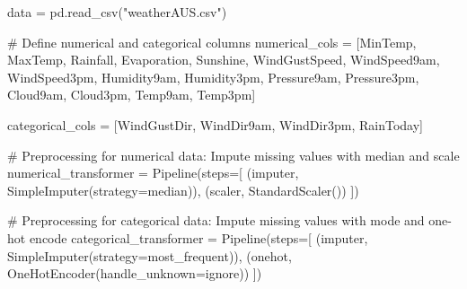 \documentclass[
  letterpaper,
  DIV=11,
  numbers=noendperiod]{scrartcl}
\newenvironment{Shaded}{\begin{snugshade}}{\end{snugshade}}
\newcommand{\CommentTok}[1]{\textcolor[rgb]{0.37,0.37,0.37}{#1}}
\newcommand{\NormalTok}[1]{\textcolor[rgb]{0.00,0.23,0.31}{#1}}
\newcommand{\OperatorTok}[1]{\textcolor[rgb]{0.37,0.37,0.37}{#1}}
\newcommand{\StringTok}[1]{\textcolor[rgb]{0.13,0.47,0.30}{#1}}
\begin{document}
\begin{Shaded}
\begin{Highlighting}[]
\NormalTok{data }\OperatorTok{=}\NormalTok{ pd.read\_csv(}\StringTok{"weatherAUS.csv"}\NormalTok{)}

\CommentTok{\# Define numerical and categorical columns}
\NormalTok{numerical\_cols }\OperatorTok{=}\NormalTok{ [}\StringTok{\textquotesingle{}MinTemp\textquotesingle{}}\NormalTok{, }\StringTok{\textquotesingle{}MaxTemp\textquotesingle{}}\NormalTok{, }\StringTok{\textquotesingle{}Rainfall\textquotesingle{}}\NormalTok{, }\StringTok{\textquotesingle{}Evaporation\textquotesingle{}}\NormalTok{, }\StringTok{\textquotesingle{}Sunshine\textquotesingle{}}\NormalTok{, }\StringTok{\textquotesingle{}WindGustSpeed\textquotesingle{}}\NormalTok{, }\StringTok{\textquotesingle{}WindSpeed9am\textquotesingle{}}\NormalTok{,}
                  \StringTok{\textquotesingle{}WindSpeed3pm\textquotesingle{}}\NormalTok{, }\StringTok{\textquotesingle{}Humidity9am\textquotesingle{}}\NormalTok{, }\StringTok{\textquotesingle{}Humidity3pm\textquotesingle{}}\NormalTok{, }\StringTok{\textquotesingle{}Pressure9am\textquotesingle{}}\NormalTok{, }\StringTok{\textquotesingle{}Pressure3pm\textquotesingle{}}\NormalTok{, }\StringTok{\textquotesingle{}Cloud9am\textquotesingle{}}\NormalTok{, }\StringTok{\textquotesingle{}Cloud3pm\textquotesingle{}}\NormalTok{,}
                  \StringTok{\textquotesingle{}Temp9am\textquotesingle{}}\NormalTok{, }\StringTok{\textquotesingle{}Temp3pm\textquotesingle{}}\NormalTok{]}
                  
\NormalTok{categorical\_cols }\OperatorTok{=}\NormalTok{ [}\StringTok{\textquotesingle{}WindGustDir\textquotesingle{}}\NormalTok{, }\StringTok{\textquotesingle{}WindDir9am\textquotesingle{}}\NormalTok{, }\StringTok{\textquotesingle{}WindDir3pm\textquotesingle{}}\NormalTok{, }\StringTok{\textquotesingle{}RainToday\textquotesingle{}}\NormalTok{]}


\CommentTok{\# Preprocessing for numerical data: Impute missing values with median and scale}
\NormalTok{numerical\_transformer }\OperatorTok{=}\NormalTok{ Pipeline(steps}\OperatorTok{=}\NormalTok{[}
\NormalTok{    (}\StringTok{\textquotesingle{}imputer\textquotesingle{}}\NormalTok{, SimpleImputer(strategy}\OperatorTok{=}\StringTok{\textquotesingle{}median\textquotesingle{}}\NormalTok{)),}
\NormalTok{    (}\StringTok{\textquotesingle{}scaler\textquotesingle{}}\NormalTok{, StandardScaler())}
\NormalTok{])}


\CommentTok{\# Preprocessing for categorical data: Impute missing values with mode and one{-}hot encode}
\NormalTok{categorical\_transformer }\OperatorTok{=}\NormalTok{ Pipeline(steps}\OperatorTok{=}\NormalTok{[}
\NormalTok{    (}\StringTok{\textquotesingle{}imputer\textquotesingle{}}\NormalTok{, SimpleImputer(strategy}\OperatorTok{=}\StringTok{\textquotesingle{}most\_frequent\textquotesingle{}}\NormalTok{)),}
\NormalTok{    (}\StringTok{\textquotesingle{}onehot\textquotesingle{}}\NormalTok{, OneHotEncoder(handle\_unknown}\OperatorTok{=}\StringTok{\textquotesingle{}ignore\textquotesingle{}}\NormalTok{))}
\NormalTok{])}



\end{Highlighting}
\end{Shaded}
\end{document}
